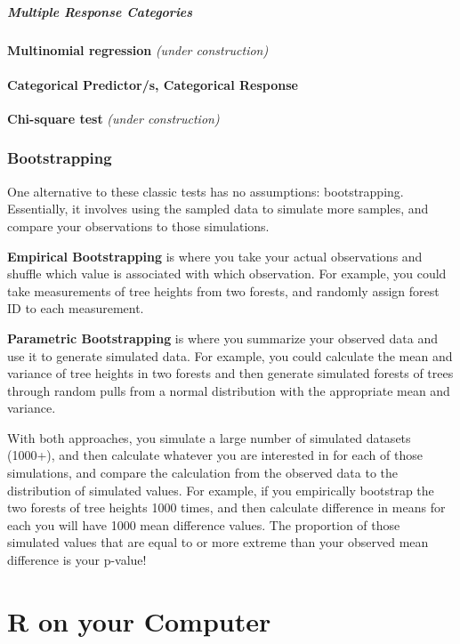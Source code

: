 \documentclass[
  letterpaper,
  DIV=11,
  numbers=noendperiod]{scrreprt}
\begin{document}
\subsubsection{Multiple Response
Categories}\label{multiple-response-categories}

\textbf{Multinomial regression} \emph{(under construction)}

\subsection{Categorical Predictor/s, Categorical
Response}\label{categorical-predictors-categorical-response}

\textbf{Chi-square test} \emph{(under construction)}

\section{Bootstrapping}\label{bootstrapping}

One alternative to these classic tests has no assumptions:
bootstrapping. Essentially, it involves using the sampled data to
simulate more samples, and compare your observations to those
simulations.

\textbf{Empirical Bootstrapping} is where you take your actual
observations and shuffle which value is associated with which
observation. For example, you could take measurements of tree heights
from two forests, and randomly assign forest ID to each measurement.

\textbf{Parametric Bootstrapping} is where you summarize your observed
data and use it to generate simulated data. For example, you could
calculate the mean and variance of tree heights in two forests and then
generate simulated forests of trees through random pulls from a normal
distribution with the appropriate mean and variance.

With both approaches, you simulate a large number of simulated datasets
(1000+), and then calculate whatever you are interested in for each of
those simulations, and compare the calculation from the observed data to
the distribution of simulated values. For example, if you empirically
bootstrap the two forests of tree heights 1000 times, and then calculate
difference in means for each you will have 1000 mean difference values.
The proportion of those simulated values that are equal to or more
extreme than your observed mean difference is your p-value!

\part{R on your Computer}
\end{document}
